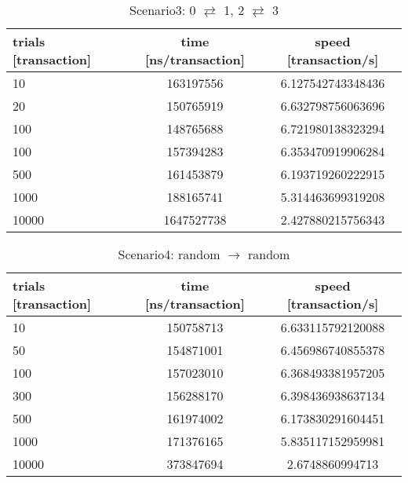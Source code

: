 \documentclass[a4j,11pt,uplatex,onecolumn]{article}
\begin{document}
\begin{table}[htb]
  \begin{center}
    \caption{Scenario3: 0 $\rightleftarrows$ 1, 2 $\rightleftarrows$ 3}
    \begin{tabular}{|l|c|c|} \hline
        trials [transaction] & time [ns/transaction] & speed [transaction/s]\\ \hline \hline
        10 & 163197556 & 6.127542743348436\\
        20 & 150765919 & 6.632798756063696\\
        100 & 148765688 & 6.721980138323294\\
        100 & 157394283 & 6.353470919906284\\
        500 & 161453879 & 6.193719260222915\\
        1000 & 188165741 & 5.314463699319208\\
        10000 & 1647527738 & 2.427880215756343\\ \hline
    \end{tabular}
  \end{center}
\end{table}

\begin{table}[htb]
  \begin{center}
    \caption{Scenario4: random $\rightarrow$ random}
    \begin{tabular}{|l|c|c|} \hline
        trials [transaction] & time [ns/transaction] & speed [transaction/s]\\ \hline \hline
        10 & 150758713 & 6.633115792120088\\
        50 & 154871001 & 6.456986740855378\\
        100 & 157023010 & 6.368493381957205\\
        300 & 156288170 & 6.398436938637134\\
        500 & 161974002 & 6.173830291604451\\
        1000 & 171376165 & 5.835117152959981\\
        10000 & 373847694 & 2.6748860994713\\ \hline
    \end{tabular}
  \end{center}
\end{table}
\end{document}
